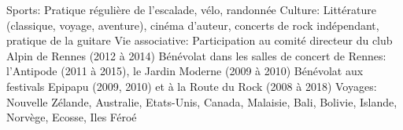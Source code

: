 \begin{cvskills}
  \cvskill
    {Sports:}
	{Pratique régulière de l'escalade, vélo, randonnée}
  \cvskill
    {Culture:}
	{
        Littérature (classique, voyage, aventure), cinéma d'auteur, concerts de
        rock indépendant, pratique de la guitare
	}
  \cvskill
    {Vie associative:}
	{
		Participation au comité directeur du club Alpin de Rennes (2012 à 2014)
		\newline
		Bénévolat dans les salles de concert de Rennes: l'Antipode (2011 à 2015),
		le Jardin Moderne (2009 à 2010) \newline
        Bénévolat aux festivals Epipapu (2009, 2010) et à la Route du Rock
        (2008 à 2018)
    }
  \cvskill
    {Voyages:}
    {Nouvelle Zélande, Australie, Etats-Unis, Canada, Malaisie, Bali, Bolivie,
    Islande, Norvège, Ecosse, Iles Féroé}
\end{cvskills}
